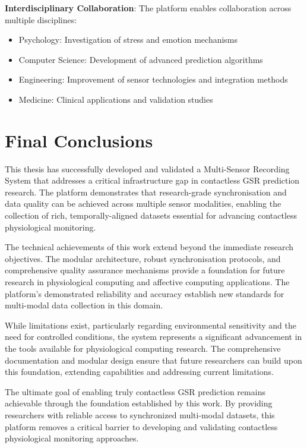 \textbf{Interdisciplinary Collaboration}: The platform enables collaboration across multiple disciplines:

\begin{itemize}
\item Psychology: Investigation of stress and emotion mechanisms
\item Computer Science: Development of advanced prediction algorithms
\item Engineering: Improvement of sensor technologies and integration methods
\item Medicine: Clinical applications and validation studies
\end{itemize}

\section{Final Conclusions}

This thesis has successfully developed and validated a Multi-Sensor Recording System that addresses a critical infrastructure gap in contactless GSR prediction research. The platform demonstrates that research-grade synchronisation and data quality can be achieved across multiple sensor modalities, enabling the collection of rich, temporally-aligned datasets essential for advancing contactless physiological monitoring.

The technical achievements of this work extend beyond the immediate research objectives. The modular architecture, robust synchronisation protocols, and comprehensive quality assurance mechanisms provide a foundation for future research in physiological computing and affective computing applications. The platform's demonstrated reliability and accuracy establish new standards for multi-modal data collection in this domain.

While limitations exist, particularly regarding environmental sensitivity and the need for controlled conditions, the system represents a significant advancement in the tools available for physiological computing research. The comprehensive documentation and modular design ensure that future researchers can build upon this foundation, extending capabilities and addressing current limitations.

The ultimate goal of enabling truly contactless GSR prediction remains achievable through the foundation established by this work. By providing researchers with reliable access to synchronized multi-modal datasets, this platform removes a critical barrier to developing and validating contactless physiological monitoring approaches.

